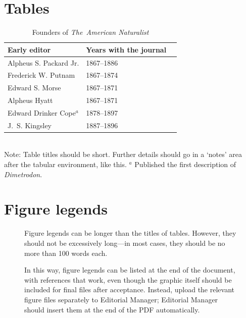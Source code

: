 \documentclass[11pt]{article}\usepackage[sc]{mathpazo} %
\begin{document}
\newpage{}

\section*{Tables}
\renewcommand{\thetable}{\arabic{table}}
\setcounter{table}{0}

\begin{table}[h]
\caption{Founders of \textit{The~American Naturalist}}
\label{Table:Founders}
\centering
\begin{tabular}{lll}\hline
Early editor            & Years with the journal \\ \hline
Alpheus S. Packard Jr.  & 1867--1886 \\
Frederick W. Putnam     & 1867--1874 \\ 
Edward S. Morse         & 1867--1871 \\ 
Alpheus Hyatt           & 1867--1871 \\
Edward Drinker Cope$^a$ & 1878--1897 \\
J.~S. Kingsley          & 1887--1896 \\ \hline 
\end{tabular}
\bigskip{}
\\
{\footnotesize Note: Table titles should be short. Further details should go in a `notes' area after the tabular environment, like this. $^a$ Published the first description of \textit{Dimetrodon}.}
\end{table}

\newpage{}

\section*{Figure legends}

\begin{figure}[h!]
\caption{Figure legends can be longer than the titles of tables. However, they should not be excessively long---in most cases, they should be no more than 100 words each.}
\label{Fig:OkapiHorn}
\end{figure}



\begin{figure}[h!]
\caption{In this way, figure legends can be listed at the end of the document, with references that work, even though the graphic itself should be included for final files after acceptance. Instead, upload the relevant figure files separately to Editorial Manager; Editorial Manager should insert them at the end of the PDF automatically.}
\label{Fig:AnotherFigure}
\end{figure}
\end{document}

